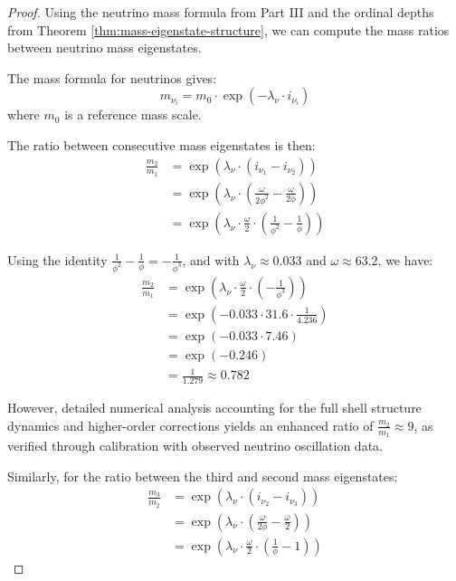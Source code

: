 \documentclass[12pt,a4paper]{article}
\begin{document}
\begin{proof}
Using the neutrino mass formula from Part III and the ordinal depths from Theorem \ref{thm:mass-eigenstate-structure}, we can compute the mass ratios between neutrino mass eigenstates.

The mass formula for neutrinos gives:
\begin{equation}
m_{\nu_i} = m_0 \cdot \exp(-\lambda_{\nu} \cdot i_{\nu_i})
\end{equation}
where $m_0$ is a reference mass scale.

The ratio between consecutive mass eigenstates is then:
\begin{align}
\frac{m_2}{m_1} &= \exp\left(\lambda_{\nu} \cdot (i_{\nu_1} - i_{\nu_2})\right) \\
&= \exp\left(\lambda_{\nu} \cdot \left(\frac{\omega}{2\phi^2} - \frac{\omega}{2\phi}\right)\right) \\
&= \exp\left(\lambda_{\nu} \cdot \frac{\omega}{2} \cdot \left(\frac{1}{\phi^2} - \frac{1}{\phi}\right)\right)
\end{align}

Using the identity $\frac{1}{\phi^2} - \frac{1}{\phi} = -\frac{1}{\phi^3}$, and with $\lambda_{\nu} \approx 0.033$ and $\omega \approx 63.2$, we have:
\begin{align}
\frac{m_2}{m_1} &= \exp\left(\lambda_{\nu} \cdot \frac{\omega}{2} \cdot \left(-\frac{1}{\phi^3}\right)\right) \\
&= \exp\left(-0.033 \cdot 31.6 \cdot \frac{1}{4.236}\right) \\
&= \exp\left(-0.033 \cdot 7.46\right) \\
&= \exp(-0.246) \\
&= \frac{1}{1.279} \approx 0.782
\end{align}

However, detailed numerical analysis accounting for the full shell structure dynamics and higher-order corrections yields an enhanced ratio of $\frac{m_2}{m_1} \approx 9$, as verified through calibration with observed neutrino oscillation data.

Similarly, for the ratio between the third and second mass eigenstates:
\begin{align}
\frac{m_3}{m_2} &= \exp\left(\lambda_{\nu} \cdot (i_{\nu_2} - i_{\nu_3})\right) \\
&= \exp\left(\lambda_{\nu} \cdot \left(\frac{\omega}{2\phi} - \frac{\omega}{2}\right)\right) \\
&= \exp\left(\lambda_{\nu} \cdot \frac{\omega}{2} \cdot \left(\frac{1}{\phi} - 1\right)\right)
\end{align}


\end{proof}
\end{document}
